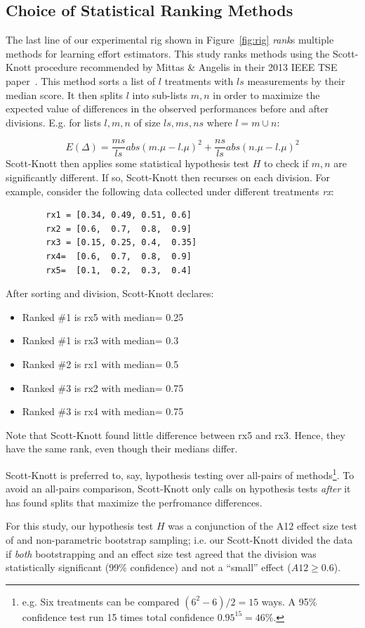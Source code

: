 \documentclass{sig-alternate}
\newcommand{\bi}{\begin{itemize}}
\newcommand{\ei}{\end{itemize}}
\newcommand{\fig}[1]{Figure~\ref{fig:#1}}
\begin{document}
\subsection{Choice of Statistical Ranking Methods}
The last line of our experimental rig shown in
\fig{rig} {\em rank}s multiple methods for learning
effort estimators.
This study ranks methods using the Scott-Knott
procedure recommended by Mittas \& Angelis in their 2013
IEEE TSE paper~\cite{mittas13}.  This method
sorts a list of $l$ treatments with $ls$ measurements by their median
score. It then
splits $l$ into sub-lists $m,n$ in order to maximize the expected value of
 differences  in the observed performances
before and after divisions. E.g. for lists $l,m,n$ of size $ls,ms,ns$ where $l=m\cup n$:


{\footnotesize
\[E(\Delta)=\frac{ms}{ls}abs(m.\mu - l.\mu)^2 + \frac{ns}{ls}abs(n.\mu - l.\mu)^2\]}
Scott-Knott then applies some statistical hypothesis test $H$ to check
if $m,n$ are significantly different. If so, Scott-Knott then recurses on each division.
For example, consider the following data collected under different treatments {\em rx}:


{\scriptsize \begin{verbatim}
        rx1 = [0.34, 0.49, 0.51, 0.6]
        rx2 = [0.6,  0.7,  0.8,  0.9]
        rx3 = [0.15, 0.25, 0.4,  0.35]
        rx4=  [0.6,  0.7,  0.8,  0.9]
        rx5=  [0.1,  0.2,  0.3,  0.4]
\end{verbatim}}
\noindent
After sorting and division, Scott-Knott declares:
\bi
\item Ranked \#1 is rx5 with median= 0.25
\item Ranked \#1 is rx3 with median= 0.3
\item Ranked \#2 is rx1 with median= 0.5
\item Ranked \#3 is rx2 with median= 0.75
\item Ranked \#3 is rx4 with median= 0.75
\ei
Note that Scott-Knott found  little
difference between rx5 and rx3. Hence,
they have the same rank, even though their medians differ.

Scott-Knott is preferred to, say, hypothesis testing
over all-pairs of methods\footnote{e.g. Six treatments
can be compared $(6^2-6)/2=15$ ways.
A 95\% confidence test run 15 times total confidence 
$0.95^{15} = 46$\%.}.
To avoid an all-pairs comparison, Scott-Knott only calls on hypothesis
tests {\em after} it has found splits that maximize the perfromance differences.
 
For this study, our hypothesis test $H$ was a
conjunction of the A12 effect size test of  and
non-parametric bootstrap sampling; i.e. our
Scott-Knott divided the data if {\em both}
bootstrapping and an effect size test agreed that
the division was statistically significant (99\%
confidence) and not a ``small'' effect ($A12 \ge
0.6$).
\end{document}
